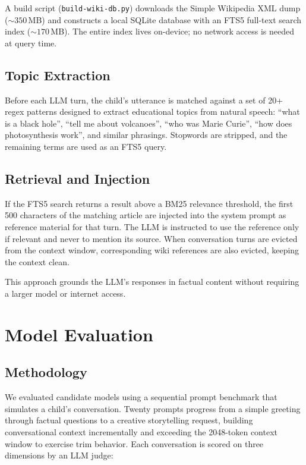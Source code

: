 \documentclass[11pt]{article}
\begin{document}
A build script (\texttt{build-wiki-db.py}) downloads the Simple Wikipedia XML dump (${\sim}350$\,MB)
and constructs a local SQLite database with an FTS5 full-text search index (${\sim}170$\,MB).
The entire index lives on-device; no network access is needed at query time.

\subsection{Topic Extraction}

Before each LLM turn, the child's utterance is matched against a set of 20+ regex patterns designed to extract educational topics from natural speech:
``what is a black hole'', ``tell me about volcanoes'', ``who was Marie Curie'', ``how does photosynthesis work'', and similar phrasings.
Stopwords are stripped, and the remaining terms are used as an FTS5 query.

\subsection{Retrieval and Injection}

If the FTS5 search returns a result above a BM25 relevance threshold,
the first 500 characters of the matching article are injected into the system prompt as reference material for that turn.
The LLM is instructed to use the reference only if relevant and never to mention its source.
When conversation turns are evicted from the context window,
corresponding wiki references are also evicted, keeping the context clean.

This approach grounds the LLM's responses in factual content without requiring a larger model or internet access.

\section{Model Evaluation}\label{sec:eval}

\subsection{Methodology}

We evaluated candidate models using a sequential prompt benchmark that simulates a child's conversation.
Twenty prompts progress from a simple greeting through factual questions to a creative storytelling request,
building conversational context incrementally and exceeding the 2048-token context window to exercise trim behavior.
Each conversation is scored on three dimensions by an LLM judge:
\end{document}

